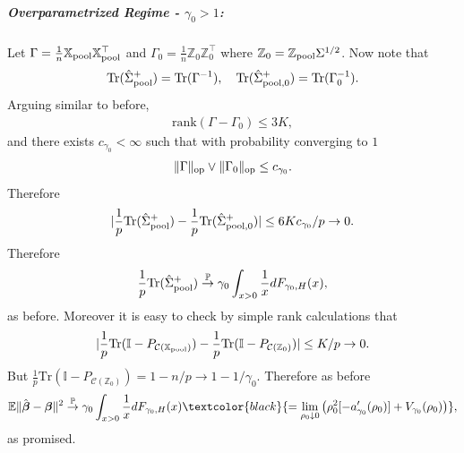 \documentclass{article}
\theoremstyle{plain}
\theoremstyle{remark}
\def \bbeta{\boldsymbol{\beta}}
\def \bbeta{\boldsymbol{\beta}}
\def \Xm {\mathbb{X}_{\rm pool}}
\def \tr {\mathrm{Tr}}
\def \I{\mathcal{I}}
\def \E{\mathbb{E}}
\def \P{\mathbb{P}}
\def \I {\mathbb{I}}
\begin{document}
\subparagraph{Overparametrized Regime - $\gamma_0>1$:} Let $\Gamma=\frac{1}{n}\Xm\Xm^\top$ and $\Gamma_0=\frac{1}{n}\mathbb{Z}_0\mathbb{Z}_0^\top$ where $\mathbb{Z}_0=\mathbb{Z}_{\rm pool}\Sigma^{1/2}$. Now note that
\begin{align*}
    \tr(\hat{\Sigma}^+_{\rm pool})=\tr(\Gamma^{-1}),\quad  \tr(\hat{\Sigma}^+_{\rm pool,0})=\tr(\Gamma_0^{-1}).
\end{align*}
Arguing similar to before,
\begin{align*}
    \mathrm{rank}(\Gamma-\Gamma_0)\leq 3K,
\end{align*}
and there exists $c_{\gamma_0}<\infty$ such that with probability converging to $1$
\begin{align*}
    \|\Gamma\|_{\rm op}\vee \|\Gamma_0\|_{\rm op}\leq c_{\gamma_0}.
\end{align*}
Therefore
\begin{align*}
    |\frac{1}{p}\tr (\hat{\Sigma}_{\rm pool}^+)-\frac{1}{p}\tr (\hat{\Sigma}_{\rm pool,0}^+)|\leq 6Kc_{\gamma_0}/p\to 0.
\end{align*}
Therefore
\begin{align*}
    \frac{1}{p}\tr (\hat{\Sigma}_{\rm pool}^+)\stackrel{\P}{\to}\gamma_0\int_{x>0}\frac{1}{x}dF_{\gamma_0,H}(x),
\end{align*}
as before. Moreover it is easy to check by simple rank calculations that
\begin{align*}
    |\frac{1}{p}\tr(\I-P_{\mathcal{C}(\Xm)})-\frac{1}{p}\tr(\I-P_{\mathcal{C}(\mathbb{Z}_0)})|\leq K/p\to 0.
\end{align*}
But $\frac{1}{p}\tr(\I-P_{\mathcal{C}(\mathbb{Z}_0)})=1-n/p\to 1-1/\gamma_0$. Therefore as before
\begin{align*}
    \E\|\hat{\bbeta}-\bbeta\|^2 \stackrel{\P}{\to} \gamma_0\int_{x>0}\frac{1}{x}dF_{\gamma_0,H}(x)\textcolor{black}{=\lim_{\rho_0\downarrow 0}\left(\rho_0^2[-a_{\gamma_0}'(\rho_0)]
    +
    V_{\gamma_0}(\rho_0)\right)},
\end{align*}
as promised.
\end{document}
